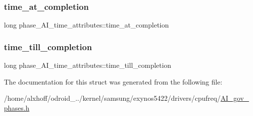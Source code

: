 \subsubsection{\texorpdfstring{time\+\_\+at\+\_\+completion}{time\_at\_completion}}
{\footnotesize\ttfamily long phase\+\_\+\+A\+I\+\_\+time\+\_\+attributes\+::time\+\_\+at\+\_\+completion}

\mbox{\label{structphase__AI__time__attributes_acab81a528eec61df42a542d70ea8fabb}} 
\subsubsection{\texorpdfstring{time\+\_\+till\+\_\+completion}{time\_till\_completion}}
{\footnotesize\ttfamily long phase\+\_\+\+A\+I\+\_\+time\+\_\+attributes\+::time\+\_\+till\+\_\+completion}



The documentation for this struct was generated from the following file\+:\begin{DoxyCompactItemize}
\item 
/home/alxhoff/odroid\+\_../kernel/samsung/exynos5422/drivers/cpufreq/\hyperlink{AI__gov__phases_8h}{A\+I\+\_\+gov\+\_\+phases.\+h}\end{DoxyCompactItemize}
